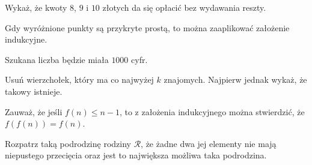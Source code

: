 
\begin{hints_list}
	\item Wykaż, że kwoty $8$, $9$ i $10$ złotych da się opłacić bez wydawania reszty.
	\item Gdy wyróżnione punkty są przykryte prostą, to można zaaplikować założenie indukcyjne.
	\item Szukana liczba będzie miała $1000$ cyfr.
	\item Usuń wierzchołek, który ma co najwyżej $k$ znajomych. Najpierw jednak wykaż, że takowy istnieje.
	\item Zauważ, że jeśli $f(n) \leqslant n - 1$, to z założenia indukcyjnego można stwierdzić, że $f(f(n)) = f(n)$.
	\item Rozpatrz taką podrodzinę rodziny $\mathcal{R}$, że żadne dwa jej elementy nie mają niepustego przecięcia oraz jest to największa możliwa taka podrodzina.
\end{hints_list}